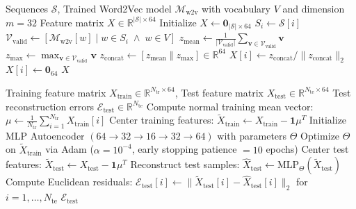 \begin{algorithm}[H]
\caption{Continuous Word2Vec Dual-Pooling Embedding Extraction}
\label{alg:w2v_pooling}
\begin{algorithmic}[1]
\Require Sequences $\mathcal{S}$, Trained Word2Vec model $\mathcal{M}_{\text{w2v}}$ with vocabulary $V$ and dimension $m=32$
\Ensure Feature matrix $X \in \mathbb{R}^{|\mathcal{S}| \times 64}$
\State Initialize $X \gets \mathbf{0}_{|\mathcal{S}| \times 64}$
    \State $S_i \gets \mathcal{S}[i]$
    \State $\mathcal{V}_{\text{valid}} \gets [ \mathcal{M}_{\text{w2v}}[w] \mid w \in S_i \;\land\; w \in V ]$
        \State $z_{\text{mean}} \gets \frac{1}{|\mathcal{V}_{\text{valid}}|} \sum_{\mathbf{v} \in \mathcal{V}_{\text{valid}}} \mathbf{v}$ 
        \State $z_{\text{max}} \gets \max_{\mathbf{v} \in \mathcal{V}_{\text{valid}}} \mathbf{v}$ 
        \State $z_{\text{concat}} \gets [z_{\text{mean}} \;\mathbin{\Vert}\; z_{\text{max}}] \in \mathbb{R}^{64}$
        \State $X[i] \gets z_{\text{concat}} / \|z_{\text{concat}}\|_2$ 
    \Else
        \State $X[i] \gets \mathbf{0}_{64}$ 
    \EndIf
\EndFor
\State \Return $X$
\end{algorithmic}
\end{algorithm}

\begin{algorithm}[H]
\caption{Deep MLP Autoencoder Optimization and Scoring}
\label{alg:ae_training}
\begin{algorithmic}[1]
\Require Training feature matrix $X_{\text{train}} \in \mathbb{R}^{N_{\text{tr}} \times 64}$, Test feature matrix $X_{\text{test}} \in \mathbb{R}^{N_{\text{te}} \times 64}$
\Ensure Test reconstruction errors $\mathcal{E}_{\text{test}} \in \mathbb{R}^{N_{\text{te}}}$
\State Compute normal training mean vector: $\mu \gets \frac{1}{N_{\text{tr}}} \sum_{i=1}^{N_{\text{tr}}} X_{\text{train}}[i]$
\State Center training features: $\widetilde{X}_{\text{train}} \gets X_{\text{train}} - \mathbf{1}\mu^T$
\State Initialize MLP Autoencoder $(64 \rightarrow 32 \rightarrow 16 \rightarrow 32 \rightarrow 64)$ with parameters $\Theta$
\State Optimize $\Theta$ on $\widetilde{X}_{\text{train}}$ via Adam ($\alpha = 10^{-4}$, early stopping patience $= 10$ epochs)
\State Center test features: $\widetilde{X}_{\text{test}} \gets X_{\text{test}} - \mathbf{1}\mu^T$
\State Reconstruct test samples: $\widehat{X}_{\text{test}} \gets \text{MLP}_{\Theta}(\widetilde{X}_{\text{test}})$
\State Compute Euclidean residuals: $\mathcal{E}_{\text{test}}[i] \gets \|\widetilde{X}_{\text{test}}[i] - \widehat{X}_{\text{test}}[i]\|_2$ for $i=1, \dots, N_{\text{te}}$
\State \Return $\mathcal{E}_{\text{test}}$
\end{algorithmic}
\end{algorithm}

